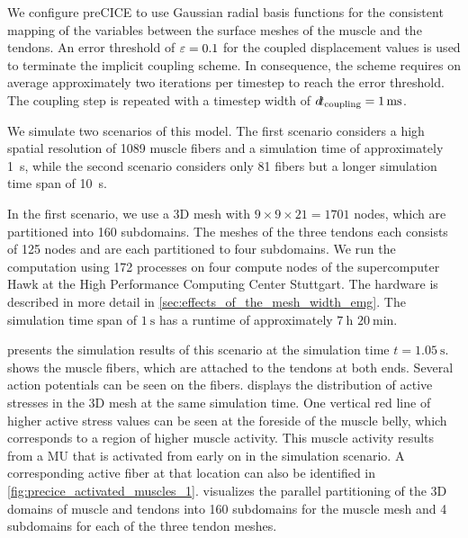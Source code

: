 We configure preCICE to use Gaussian radial basis functions for the consistent mapping of the variables between the surface meshes of the muscle and the tendons. 
An error threshold of $\varepsilon=0.1$ for the coupled displacement values is used to terminate the implicit coupling scheme. In consequence, the scheme requires on average approximately two iterations per timestep to reach the error threshold. The coupling step is repeated with a timestep width of $\dt_\text{coupling} = \SI{1}{\ms}$.

We simulate two scenarios of this model. The first scenario considers a high spatial resolution of 1089 muscle fibers and a simulation time of approximately \SI{1}{\s}, while the second scenario considers only 81 fibers but a longer simulation time span of \SI{10}{\s}. 

In the first scenario, we use a 3D mesh with $9\times 9 \times 21=1701$ nodes, which are partitioned into 160 subdomains.
The meshes of the three tendons each consists of 125 nodes and are each partitioned to four subdomains. We run the computation using 172 processes on four compute nodes of the supercomputer Hawk at the High Performance Computing Center Stuttgart. The hardware is described in more detail in  \cref{sec:effects_of_the_mesh_width_emg}. The simulation time span of $\SI{1}{\s}$ has a runtime of approximately $\SI{7}{\hour}$ $\SI{20}{\minute}$.

 presents the simulation results of this scenario at the simulation time $t=\SI{1.05}{\s}$.  shows the muscle fibers, which are attached to the tendons at both ends. Several action potentials can be seen on the fibers.  displays the distribution of active stresses in the 3D mesh at the same simulation time. One vertical red line of higher active stress values can be seen at the foreside of the muscle belly, which corresponds to a region of higher muscle activity. This muscle activity results from a MU that is activated from early on in the simulation scenario. A corresponding active fiber at that location can also be identified in \cref{fig:precice_activated_muscles_1}.
 visualizes the parallel partitioning of the 3D domains of muscle and tendons into 160 subdomains for the muscle mesh and 4 subdomains for each of the three tendon meshes.

